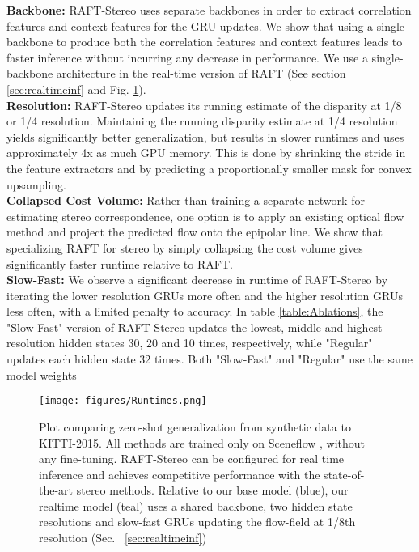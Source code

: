 \documentclass[10pt,twocolumn,letterpaper]{article}
\begin{document}
\noindent\textbf{Backbone:} RAFT-Stereo uses separate backbones in order to extract correlation features and context features for the GRU updates. We show that using a single backbone to produce both the correlation features and context features leads to faster inference without incurring any decrease in performance. We use a single-backbone architecture in the real-time version of RAFT (See section \ref{sec:realtimeinf} and Fig. \ref{fig:Runtimes}).\smallskip\\
\noindent\textbf{Resolution:} RAFT-Stereo updates its running estimate of the disparity at 1/8 or 1/4 resolution. Maintaining the running disparity estimate at 1/4 resolution yields significantly better generalization, but results in slower runtimes and uses approximately 4x as much GPU memory. This is done by shrinking the stride in the feature extractors and by predicting a proportionally smaller mask for convex upsampling.\smallskip\\
\noindent\textbf{Collapsed Cost Volume:} Rather than training a separate network for estimating stereo correspondence, one option is to apply an existing optical flow method and project the predicted flow onto the epipolar line. We show that specializing RAFT for stereo by simply collapsing the cost volume gives significantly faster runtime relative to RAFT.  \smallskip\\
\noindent\textbf{Slow-Fast:} We observe a significant decrease in runtime of RAFT-Stereo by iterating the lower resolution GRUs more often and the higher resolution GRUs less often, with a limited penalty to accuracy. In table \ref{table:Ablations}, the "Slow-Fast" version of RAFT-Stereo updates the lowest, middle and highest resolution hidden states 30, 20 and 10 times, respectively, while "Regular" updates each hidden state 32 times. Both "Slow-Fast" and "Regular" use the same model weights



\begin{figure}[ht]
    \centering
    \vspace{-8mm}
	\texttt{[image: figures/Runtimes.png]}
	\caption{Plot comparing zero-shot generalization from synthetic data to KITTI-2015. All methods are trained only on Sceneflow \cite{sceneflow}, without any fine-tuning. RAFT-Stereo can be configured for real time inference and achieves competitive performance with the state-of-the-art stereo methods. Relative to our base model (blue), our realtime model (teal)  uses a shared backbone, two hidden state resolutions and slow-fast GRUs updating the flow-field at 1/8th resolution (Sec. ~\ref{sec:realtimeinf})}
	\label{fig:Runtimes}
\end{figure}
\end{document}
